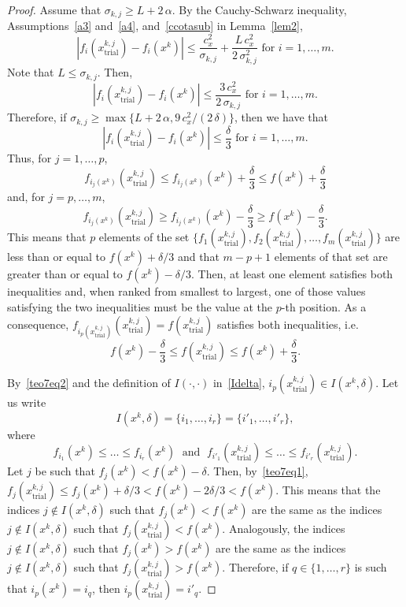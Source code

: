 \documentclass[11pt]{article}
\newcommand{\xkjtrial}{x^{k,j}_{\mathrm{trial}}}
\begin{document}
\begin{proof}
Assume that $\sigma_{k,j} \geq L + 2 \, \alpha$. By the Cauchy-Schwarz inequality, Assumptions~\ref{a3} and~\ref{a4}, and~\eqref{ccotasub} in Lemma~\ref{lem2},  
\[
\left| f_i(\xkjtrial) - f_i(x^k) \right| \leq \dfrac{c_x^2}{\sigma_{k,j}} + \dfrac{L \, c_x^2}{2\,\sigma_{k,j}^2} \mbox{ for } i=1,\dots,m.
\]
Note that $L \leq \sigma_{k,j}$. Then, 
\[
\left| f_i(\xkjtrial) - f_i(x^k) \right| \leq \dfrac{3 \, c_x^2}{2 \, \sigma_{k,j}} \mbox{ for } i=1,\dots,m.
\]
Therefore, if $\sigma_{k,j} \geq \max \{ L + 2 \, \alpha, 9 \, c_x^2 / (2 \, \delta) \}$, then we have that
\begin{equation}\label{teo7eq1}
\left| f_i(\xkjtrial) - f_i(x^k) \right| \leq \dfrac{\delta}{3} \mbox{ for } i=1,\dots,m.
\end{equation}
Thus, for $j=1,\dots,p$,
\[
f_{i_j(x^k)}(\xkjtrial)\leq f_{i_j(x^k)}(x^k)+\dfrac{\delta}{3}\leq f(x^k)+\dfrac{\delta}{3}
\]
and, for $j=p,\dots,m$,
\[
f_{i_j(x^k)}(\xkjtrial)\geq f_{i_j(x^k)}(x^k)-\dfrac{\delta}{3}\geq f(x^k)-\dfrac{\delta}{3}.
\]
This means that $p$ elements of the set $\{f_1(\xkjtrial),f_2(\xkjtrial),\dots,f_m(\xkjtrial)\}$ are less than or equal to $f(x^k)+\delta/3$ and that $m-p+1$ elements of that set are greater than or equal to $f(x^k)-\delta/3$. Then, at least one element satisfies both inequalities and, when ranked from smallest to largest, one of those values satisfying the two inequalities must be the value at the $p$-th position. As a consequence, $f_{i_p(\xkjtrial)}(\xkjtrial) = f(\xkjtrial)$ satisfies both inequalities, i.e.\
\begin{equation}\label{teo7eq2}
f(x^k)-\dfrac{\delta}{3} \leq f(\xkjtrial) \leq f(x^k)+\dfrac{\delta}{3}.
\end{equation}

By~\eqref{teo7eq2} and the definition of $I(\cdot,\cdot)$ in~\eqref{Idelta}, $i_p(\xkjtrial) \in I(x^k,\delta)$.
Let us write
\[
I(x^k,\delta)=\{i_1,\dots,i_r\}=\{i'_1,\dots,i'_r\},
\]
where
\[
f_{i_1}(x^k) \leq \dots \leq f_{i_r}(x^k) \;\mbox{ and } \; 
f_{i'_1}(\xkjtrial) \leq \dots \leq f_{i'_r}(\xkjtrial).
\]
Let $j$ be such that $f_j(x^k)<f(x^k)-\delta$. Then, by~\eqref{teo7eq1}, $f_j(\xkjtrial)\leq f_j(x^k)+\delta/3<f(x^k)-2\delta/3<f(x^k)$. This means that the indices $j\not\in I(x^k,\delta)$ such that $f_j(x^k)<f(x^k)$ are the same as the indices $j\not\in I(x^k,\delta)$ such that $f_j(\xkjtrial)<f(x^k)$. Analogously, the indices $j\not\in I(x^k,\delta)$ such that $f_j(x^k)>f(x^k)$ are the same as the indices $j\not\in I(x^k,\delta)$ such that $f_j(\xkjtrial)>f(x^k)$. Therefore, if $q\in\{1,\dots,r\}$ is such that $i_p(x^k)=i_q$, then $i_p(\xkjtrial)=i'_q$.
    

\end{proof}
\end{document}
